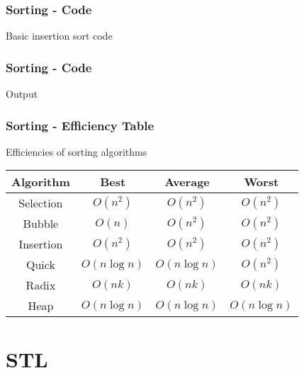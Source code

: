 \documentclass[c, aspectratio=169]{beamer}
\begin{document}
\begin{frame}\frametitle{Sorting - Code}
Basic insertion sort code

\end{frame}

\begin{frame}\frametitle{Sorting - Code}
Output

\end{frame}

\begin{frame}\end{frame}
\begin{frame}\end{frame}
\begin{frame}\end{frame}
\begin{frame}\end{frame}
\begin{frame}\end{frame}
\begin{frame}\end{frame}

\begin{frame}\frametitle{Sorting - Efficiency Table}
Efficiencies of sorting algorithms
\begin{center}
\begin{tabular}{|c|c|c|c|}
\hline Algorithm & Best & Average & Worst\\\hline
Selection & $O(n^2)$ & $O(n^2)$ & $O(n^2)$\\\hline
Bubble & $O(n)$ & $O(n^2)$ & $O(n^2)$\\\hline
Insertion & $O(n^2)$ & $O(n^2)$ & $O(n^2)$\\\hline
Quick & $O(n\log n)$ & $O(n\log n)$ & $O(n^2)$\\\hline
Radix & $O(nk)$ & $O(nk)$ & $O(nk)$\\\hline
Heap & $O(n\log n)$ & $O(n\log n)$ & $O(n\log n)$\\\hline
\end{tabular}
\end{center}
\end{frame}

\section{STL}
\begin{frame}\end{frame}
\begin{frame}\end{frame}
\begin{frame}\end{frame}
\end{document}
